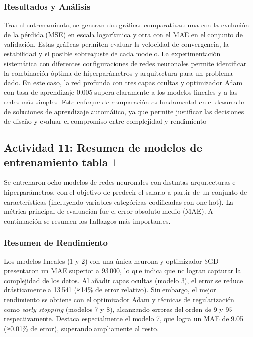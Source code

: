 \documentclass[12pt]{article}
\begin{document}
\subsubsection*{Resultados y Análisis}

Tras el entrenamiento, se generan dos gráficas comparativas: una con la evolución de la pérdida (MSE) en escala logarítmica y otra con el MAE en el conjunto de validación. Estas gráficas permiten evaluar la velocidad de convergencia, la estabilidad y el posible sobreajuste de cada modelo.
La experimentación sistemática con diferentes configuraciones de redes neuronales permite identificar la combinación óptima de hiperparámetros y arquitectura para un problema dado. En este caso, la red profunda con tres capas ocultas y optimizador Adam con tasa de aprendizaje 0.005 supera claramente a los modelos lineales y a las redes más simples. Este enfoque de comparación es fundamental en el desarrollo de soluciones de aprendizaje automático, ya que permite justificar las decisiones de diseño y evaluar el compromiso entre complejidad y rendimiento.

\subsection{Actividad 11: Resumen de modelos de entrenamiento tabla 1}

Se entrenaron ocho modelos de redes neuronales con distintas arquitecturas e hiperparámetros, con el objetivo de predecir el salario a partir de un conjunto de características (incluyendo variables categóricas codificadas con one-hot). La métrica principal de evaluación fue el error absoluto medio (MAE). A continuación se resumen los hallazgos más importantes.

\subsubsection*{Resumen de Rendimiento}

Los modelos lineales (1 y 2) con una única neurona y optimizador SGD presentaron un MAE superior a 93\,000, lo que indica que no logran capturar la complejidad de los datos. Al añadir capas ocultas (modelo 3), el error se reduce drásticamente a 13\,541 (≈14\% de error relativo). Sin embargo, el mejor rendimiento se obtiene con el optimizador Adam y técnicas de regularización como \textit{early stopping} (modelos 7 y 8), alcanzando errores del orden de 9 y 95 respectivamente. Destaca especialmente el modelo 7, que logra un MAE de 9.05 (≈0.01\% de error), superando ampliamente al resto.
\end{document}
